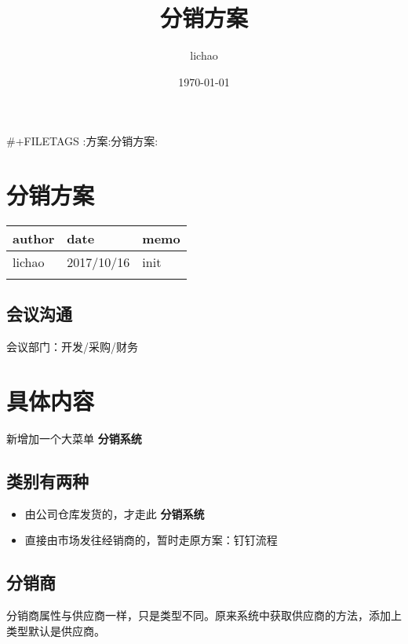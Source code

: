 \documentclass[11pt]{article}
\author{lichao}
\date{\today}
\title{分销方案}
\begin{document}
\maketitle
\tableofcontents

\#+FILETAGS :方案:分销方案:
\section{分销方案}
\label{sec:org6251bd4}
\begin{center}
\begin{tabular}{lll}
author & date & memo\\
\hline
lichao & 2017/10/16 & init\\
 &  & \\
\end{tabular}
\end{center}
\subsection{会议沟通}
\label{sec:org274869e}
会议部门：开发/采购/财务
\section{具体内容}
\label{sec:org327c16e}
新增加一个大菜单 \textbf{分销系统}
\subsection{类别有两种}
\label{sec:org50c8e67}
\begin{itemize}
\item 由公司仓库发货的，才走此 \textbf{分销系统}
\item 直接由市场发往经销商的，暂时走原方案：钉钉流程
\end{itemize}
\subsection{分销商}
\label{sec:org4ad51ea}
分销商属性与供应商一样，只是类型不同。原来系统中获取供应商的方法，添加上类型默认是供应商。
\end{document}
